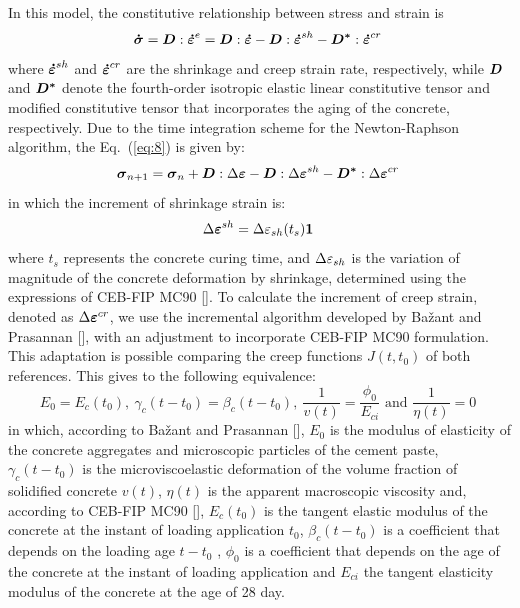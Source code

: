 \documentclass[a4paper,fleqn]{cas-sc}
\begin{document}
In this model, the constitutive relationship between stress and strain is 
\begin{equation} \label{eq:8}
	\boldsymbol{\dot{\sigma}} = \boldsymbol{D} : \boldsymbol{\dot{\varepsilon}}^{e} = \boldsymbol{D} : \boldsymbol{\dot{\varepsilon}} - \boldsymbol{D} : \boldsymbol{\dot{\varepsilon}}^{sh} - \boldsymbol{D^{*}} : \boldsymbol{\dot{\varepsilon}}^{cr}\;
\end{equation}
where $\boldsymbol{\dot{\varepsilon}}^{sh}$  and $\boldsymbol{\dot{\varepsilon}}^{cr}$ are the shrinkage and creep strain rate, respectively, while $\boldsymbol{D}$ and $\boldsymbol{D^{*}}$ denote the fourth-order isotropic elastic linear constitutive tensor and modified constitutive tensor that incorporates the aging of the concrete, respectively. Due to the time integration scheme for the Newton-Raphson algorithm, the Eq.~(\ref{eq:8}) is given by:
\begin{equation} \label{eq:9}
	\boldsymbol{\sigma}_{n+1} = \boldsymbol{\sigma}_{n}+\boldsymbol{D} : \Delta \boldsymbol{\varepsilon} - \boldsymbol{D} : \Delta \boldsymbol{\varepsilon}^{sh} - \boldsymbol{D^{*}} : \Delta \boldsymbol{\varepsilon}^{cr} \;
\end{equation}
in which the increment of shrinkage strain is:
\begin{equation} \label{eq:10}
	\Delta \boldsymbol{\varepsilon}^{sh} =  \Delta \varepsilon_{sh}(t_{s}) \boldsymbol{1} \;
\end{equation}
where $t_{s}$ represents the concrete curing time, and $\Delta \varepsilon_{sh}$ is the variation of magnitude of the concrete deformation by shrinkage, determined using the expressions of CEB-FIP MC90 []. To calculate the increment of creep strain, denoted as $\Delta \boldsymbol{\varepsilon}^{cr}$, we use the incremental algorithm developed by Bažant and Prasannan [], with an adjustment to incorporate CEB-FIP MC90 formulation. This adaptation is possible comparing the creep functions $J(t,t_0)$ of both references. This gives to the following equivalence:
\begin{equation} \label{eq:11}
	E_0 = E_c(t_0),~ \gamma_c(t-t_0)=\beta_c(t-t_0),~ \frac{1}{v(t)} = \frac{\phi_0}{E_{ci}} \text{  and  } \frac{1}{\eta(t)}=0 \;
\end{equation}
in which, according to Bažant and Prasannan [], $E_0$  is the modulus of elasticity of the concrete aggregates and microscopic particles of the cement paste, $\gamma_c(t-t_0)$ is the microviscoelastic deformation of the volume fraction of solidified concrete $v(t)$, $\eta(t)$ is the apparent macroscopic viscosity and, according to CEB-FIP MC90 [], $E_c(t_0)$ is the tangent elastic modulus of the concrete at the instant of loading application $t_0$, $\beta_c(t-t_0)$  is a coefficient that depends on the loading age $t-t_0$ , $\phi_0$ is a coefficient that depends on the age of the concrete at the instant of loading application and $E_{ci}$  the tangent elasticity modulus of the concrete at the age of 28 day.
\end{document}
